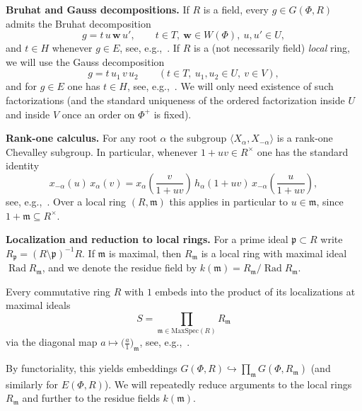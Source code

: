 \documentclass[]{jgcc}
\DeclareMathOperator{\Rad}{Rad}
\numberwithin{equation}{section}
\begin{document}
\medskip
\noindent\textbf{Bruhat and Gauss decompositions.}
If $R$ is a field, every $g\in G(\Phi,R)$ admits the Bruhat decomposition
\begin{equation}\label{eq:Bruhat}
g=t\,u\,\mathbf w\,u', \qquad t\in T,\ \mathbf w\in W(\Phi),\ u,u'\in U,
\end{equation}
and $t\in H$ whenever $g\in E$, see, e.g.,~\cite{Carter,Steinberg}.
If $R$ is a (not necessarily field) \emph{local} ring, we will use the Gauss decomposition
\begin{equation}\label{eq:Gauss}
g=t\,u_1\,v\,u_2\qquad (t\in T,\ u_1,u_2\in U,\ v\in V),
\end{equation}
and for $g\in E$ one has $t\in H$, see, e.g.,~\cite{Abe1969}. We will only need existence of such factorizations
(and the standard uniqueness of the ordered factorization inside $U$ and inside $V$ once an order
on $\Phi^+$ is fixed).

\medskip
\noindent\textbf{Rank-one calculus.}
For any root $\alpha$ the subgroup $\langle X_\alpha,X_{-\alpha}\rangle$ is a rank-one
Chevalley subgroup. In particular, whenever $1+uv\in R^\times$ one has the standard identity
\begin{equation}\label{eq:rankone}
x_{-\alpha}(u)\,x_\alpha(v)
=
x_\alpha\!\left(\frac{v}{1+uv}\right)\,h_\alpha(1+uv)\,
x_{-\alpha}\!\left(\frac{u}{1+uv}\right),
\end{equation}
see, e.g.,~\cite{Steinberg}. Over a local ring $(R,\mathfrak m)$ this applies in particular to
$u\in\mathfrak m$, since $1+\mathfrak m\subseteq R^\times$.

\medskip
\noindent\textbf{Localization and reduction to local rings.}
For a prime ideal $\mathfrak p\subset R$ write $R_{\mathfrak p}=(R\setminus\mathfrak p)^{-1}R$.
If $\mathfrak m$ is maximal, then $R_{\mathfrak m}$ is a local ring with maximal ideal
$\Rad R_{\mathfrak m}$, and we denote the residue field by
$k(\mathfrak m)=R_{\mathfrak m}/\Rad R_{\mathfrak m}$.

\begin{prop}\label{inlocal}
Every commutative ring $R$ with $1$ embeds into the product of its localizations at maximal ideals
\[
S=\prod_{\mathfrak m\in\mathrm{MaxSpec}(R)} R_{\mathfrak m}
\]
via the diagonal map $a\mapsto \bigl(\frac{a}{1}\bigr)_{\mathfrak m}$,
see, e.g.,~\cite{AtiyahMacdonald}.
\end{prop}

By functoriality, this yields embeddings
$G(\Phi,R)\hookrightarrow \prod_{\mathfrak m} G(\Phi,R_{\mathfrak m})$
(and similarly for $E(\Phi,R)$). We will repeatedly reduce arguments to the local rings $R_{\mathfrak m}$
and further to the residue fields $k(\mathfrak m)$.
\end{document}
